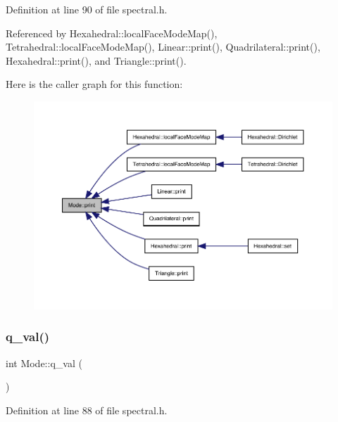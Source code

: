 Definition at line 90 of file spectral.\+h.



Referenced by Hexahedral\+::local\+Face\+Mode\+Map(), Tetrahedral\+::local\+Face\+Mode\+Map(), Linear\+::print(), Quadrilateral\+::print(), Hexahedral\+::print(), and Triangle\+::print().

Here is the caller graph for this function\+:
\nopagebreak
\begin{figure}[H]
\begin{center}
\leavevmode
\includegraphics[width=350pt]{classMode_ad5e7c7fc1712619979296b514d2418cf_icgraph}
\end{center}
\end{figure}
\mbox{\label{classMode_a5c50861f423cbfea476d37d1dfa4e1cb}} 
\subsubsection{\texorpdfstring{q\+\_\+val()}{q\_val()}}
{\footnotesize\ttfamily int Mode\+::q\+\_\+val (\begin{DoxyParamCaption}{ }\end{DoxyParamCaption})\hspace{0.3cm}{\ttfamily [inline]}}



Definition at line 88 of file spectral.\+h.



